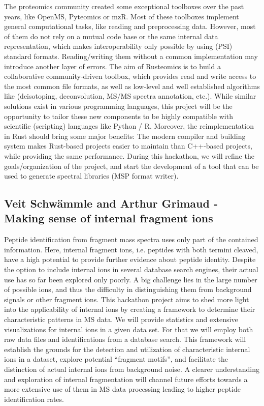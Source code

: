 The proteomics community created some exceptional toolboxes over the past years, like OpenMS, Pyteomics or mzR. Most of these toolboxes implement general computational tasks, like reading and preprocessing data. However, most of them do not rely on a mutual code base or the same internal data representation, which makes interoperability only possible by using (PSI) standard formats. Reading/writing them without a common implementation may introduce another layer of errors.
The aim of Rusteomics is to build a collaborative community-driven toolbox, which provides read and write access to the most common file formats, as well as low-level and well established algorithms like (deisotoping, deconvolution, MS/MS spectra annotation, etc.).
While similar solutions exist in various programming languages, this project will be the opportunity to tailor these new components to be highly compatible with scientific (scripting) languages like Python / R. Moreover, the reimplementation in Rust should bring some major benefits: The modern compiler and building system makes Rust-based projects easier to maintain than C++-based projects, while providing the same performance.
During this hackathon, we will refine the goals/organization of the project, and start the development of a tool that can be used to generate spectral libraries (MSP format writer).\\

\subsection{Veit Schwämmle and Arthur Grimaud - Making sense of internal fragment ions}

Peptide identification from fragment mass spectra uses only part of the contained information. Here, internal fragment ions, i.e. peptides with both termini cleaved, have a high potential to provide further evidence about peptide identity. Despite the option to include internal ions in several database search engines, their actual use has so far been explored only poorly. A big challenge lies in the large number of possible ions, and thus the difficulty in distinguishing them from background signals or other fragment ions. This hackathon project aims to shed more light into the applicability of internal ions by creating a framework to determine their characteristic patterns in MS data. We will provide statistics and extensive visualizations for internal ions in a given data set. For that we will employ both raw data files and identifications from a database search. This framework will establish the grounds for the detection and utilization of characteristic internal ions in a dataset, explore potential “fragment motifs”, and facilitate the distinction of actual internal ions from background noise. A clearer understanding and exploration of internal fragmentation will channel future efforts towards a more extensive use of them in MS data processing leading to higher peptide identification rates.\\


